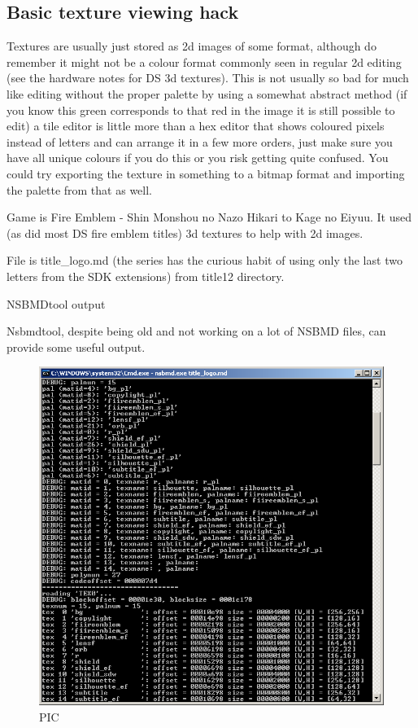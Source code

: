 \documentclass[
]{book}
\begin{document}
\hypertarget{basic-texture-viewing-hack}{%
\subsection{Basic texture viewing hack}\label{basic-texture-viewing-hack}}

Textures are usually just stored as 2d images of some format, although do remember it might not be a colour format commonly seen in regular 2d editing (see the hardware notes for DS 3d textures). This is not usually so bad for much like editing without the proper palette by using a somewhat abstract method (if you know this green corresponds to that red in the image it is still possible to edit) a tile editor is little more than a hex editor that shows coloured pixels instead of letters and can arrange it in a few more orders, just make sure you have all unique colours if you do this or you risk getting quite confused. You could try exporting the texture in something to a bitmap format and importing the palette from that as well.

Game is Fire Emblem - Shin Monshou no Nazo Hikari to Kage no Eiyuu. It used (as did most DS fire emblem titles) 3d textures to help with 2d images.

File is title\_logo.md (the series has the curious habit of using only the last two letters from the SDK extensions) from title12 directory.

NSBMDtool output

Nsbmdtool, despite being old and not working on a lot of NSBMD files, can provide some useful output.

\begin{figure}
\centering
\includegraphics{images/69_home_fast6191_romhackingguide_unrenamed_file___gguidegraphics3dminorNSMBDtexturedecoding_1.png}
\caption{PIC}
\end{figure}
\end{document}
